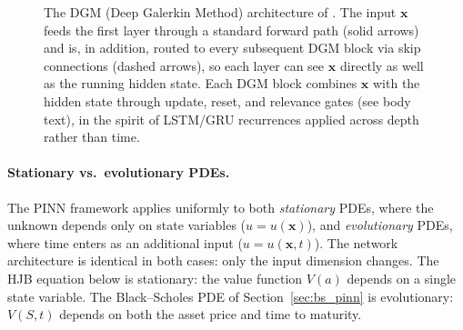 \documentclass[11pt,a4paper]{report}
\newcommand{\x}{\bm{x}}
\begin{document}
\begin{figure}[ht]
\centering
{}
\caption{The DGM (Deep Galerkin Method) architecture of \citet{sirignano2018dgm}. The input $\x$ feeds the first layer through a standard forward path (solid arrows) and is, in addition, routed to every subsequent DGM block via skip connections (dashed arrows), so each layer can see $\x$ directly as well as the running hidden state. Each DGM block combines $\x$ with the hidden state through update, reset, and relevance gates (see body text), in the spirit of LSTM/GRU recurrences applied across depth rather than time.}
\label{fig:dgm_architecture}
\end{figure}

\paragraph{Stationary vs.\ evolutionary PDEs.}
The PINN framework applies uniformly to both \emph{stationary} PDEs, where the unknown depends only on state variables ($u = u(\mathbf{x})$), and \emph{evolutionary} PDEs, where time enters as an additional input ($u = u(\mathbf{x}, t)$).  The network architecture is identical in both cases: only the input dimension changes.  The HJB equation below is stationary: the value function $V(a)$ depends on a single state variable.  The Black--Scholes PDE of Section~\ref{sec:bs_pinn} is evolutionary: $V(S,t)$ depends on both the asset price and time to maturity.
\end{document}
